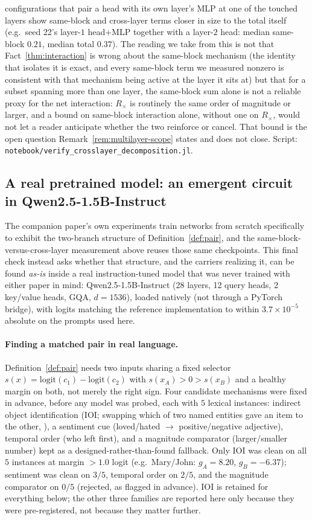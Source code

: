 \documentclass[11pt,a4paper]{article}
\begin{document}
configurations that pair a head with its own layer's MLP at one of the
touched layers show same-block and cross-layer terms closer in size to the
total itself (e.g.\ seed 22's layer-$1$ head+MLP together with a layer-$2$
head: median same-block $0.21$, median total $0.37$). The reading we take
from this is not that Fact~\ref{thm:interaction} is wrong about the
same-block mechanism (the identity that isolates it is exact, and every
same-block term we measured nonzero is consistent with that mechanism being
active at the layer it sits at) but that for a subset spanning more than one
layer, the same-block sum alone is not a reliable proxy for the net
interaction: $R_\times$ is routinely the same order of magnitude or larger,
and a bound on same-block interaction alone, without one on $R_\times$,
would not let a reader anticipate whether the two reinforce or cancel. That
bound is the open question Remark~\ref{rem:multilayer-scope} states and does
not close. Script: \texttt{notebook/\allowbreak verify\_crosslayer\_decomposition.jl}.

\subsection{A real pretrained model: an emergent circuit in
Qwen2.5-1.5B-Instruct}
\label{sec:qwen}

The companion paper's own experiments train networks from scratch
specifically to exhibit the two-branch structure of
Definition~\ref{def:pair}, and the same-block-versus-cross-layer measurement
above reuses those same checkpoints. This final check instead asks whether
that structure, and the carriers realizing it, can be found \emph{as-is}
inside a real instruction-tuned model that was never trained with either
paper in mind: Qwen2.5-1.5B-Instruct (28 layers, 12 query heads, 2 key/value
heads, GQA, $d=1536$), loaded natively (not through a PyTorch bridge), with
logits matching the reference implementation to within $3.7\times10^{-5}$
absolute on the prompts used here.

\paragraph{Finding a matched pair in real language.} Definition~\ref{def:pair}
needs two inputs sharing a fixed selector $s(x)=\mathrm{logit}(c_1)-\mathrm{logit}(c_2)$
with $s(x_A)>0>s(x_B)$ and a healthy margin on both, not merely the right
sign. Four candidate mechanisms were fixed in advance, before any model was
probed, each with $5$ lexical instances: indirect object identification (IOI;
swapping which of two named entities gave an item to the other,
\cite{wang2023}), a sentiment cue (loved/hated $\to$ positive/negative
adjective), temporal order (who left first), and a magnitude comparator
(larger/smaller number) kept as a designed-rather-than-found fallback. Only
IOI was clean on all $5$ instances at margin $>1.0$ logit (e.g.\ Mary/John:
$g_A=8.20$, $g_B=-6.37$); sentiment was clean on $3/5$, temporal order on
$2/5$, and the magnitude comparator on $0/5$ (rejected, as flagged in advance).
IOI is retained for everything below; the other three families are reported
here only because they were pre-registered, not because they matter further.
\end{document}
